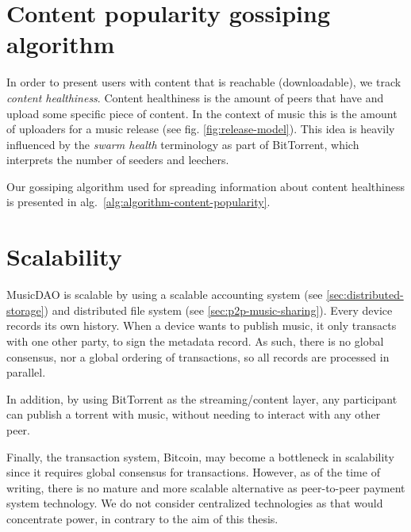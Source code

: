 

\section{Content popularity gossiping algorithm}
In order to present users with content that is reachable (downloadable), we track \textit{content healthiness}. Content healthiness is the amount of peers that have and upload some specific piece of content. In the context of music this is the amount of uploaders for a music release (see fig. \ref{fig:release-model}). This idea is heavily influenced by the \textit{swarm health} terminology as part of BitTorrent, which interprets the number of seeders and leechers.


Our gossiping algorithm used for spreading information about content healthiness is presented in alg.~\ref{alg:algorithm-content-popularity}.



\section{Scalability}
MusicDAO is scalable by using a scalable accounting system (see \ref{sec:distributed-storage}) and distributed file system (see \ref{sec:p2p-music-sharing}). Every device records its own history. When a device wants to publish music, it only transacts with one other party, to sign the metadata record. As such, there is no global consensus, nor a global ordering of transactions, so all records are processed in parallel.

In addition, by using BitTorrent as the streaming/content layer, any participant can publish a torrent with music, without needing to interact with any other peer. 

Finally, the transaction system, Bitcoin, may become a bottleneck in scalability since it requires global consensus for transactions. 
However, as of the time of writing, there is no mature and more scalable alternative as peer-to-peer payment system technology. We do not consider centralized technologies as that would concentrate power, in contrary to the aim of this thesis. %
